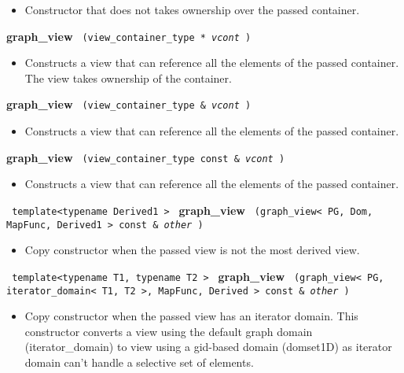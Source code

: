 \begin{itemize}
\item
Constructor that does not takes ownership over the passed container.
\end{itemize}

\noindent
\textbf{graph\_view}%
\texttt{%
(view\_container\_type *
\textit{vcont}%
)
}

\begin{itemize}
\item
Constructs a view that can reference all the elements of the passed container. The view takes ownership of the container.
\end{itemize}

\noindent
\textbf{graph\_view}%
\texttt{%
(view\_container\_type \&
\textit{vcont}%
)
}

\begin{itemize}
\item
Constructs a view that can reference all the elements of the passed container.
\end{itemize}

\noindent
\textbf{graph\_view}%
\texttt{%
(view\_container\_type const \&
\textit{vcont}%
)
}

\begin{itemize}
\item
Constructs a view that can reference all the elements of the passed container.
\end{itemize}

\noindent
\texttt{%
template<typename Derived1 >
}
\newline
\textbf{graph\_view}%
\texttt{%
(graph\_view< PG, Dom, MapFunc, Derived1 > const \&
\textit{other}%
)
}

\begin{itemize}
\item
Copy constructor when the passed view is not the most derived view.
\end{itemize}

\noindent
\texttt{%
template<typename T1, typename T2 >
}
\newline
\textbf{graph\_view}%
\texttt{%
(graph\_view< PG, iterator\_domain< T1, T2 >, MapFunc, Derived > const \&
\textit{other}%
)
}

\begin{itemize}
\item
Copy constructor when the passed view has an iterator domain. This constructor converts a view using the default graph domain (iterator\_domain) to view using a gid-based domain (domset1D) as iterator domain can't handle a selective set of elements.
\end{itemize}

